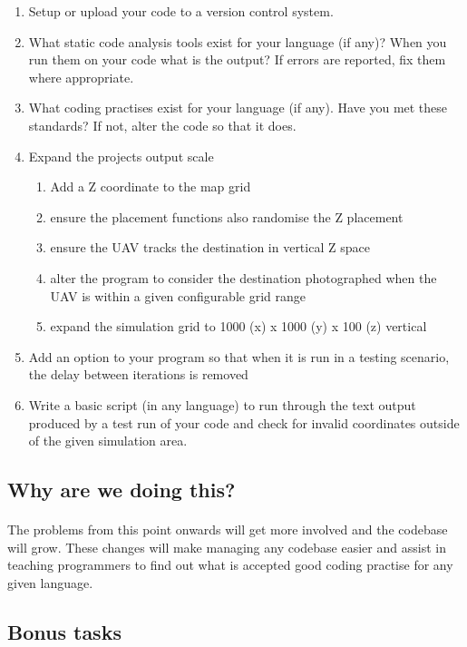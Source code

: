 \documentclass[11pt]{book}
\begin{document}
\begin{enumerate}
\item Setup or upload your code to a version control system.
\item What static code analysis tools exist for your language (if any)? When you run them on your code what is the output? If errors are reported, fix them where appropriate.
\item What coding practises exist for your language (if any). Have you met these standards? If not, alter the code so that it does.
\item Expand the projects output scale
    \begin{enumerate}
        \item Add a Z coordinate to the map grid
        \item ensure the placement functions also randomise the Z placement
        \item ensure the UAV tracks the destination in vertical Z space
        \item alter the program to consider the destination photographed when the UAV is within a given configurable grid range
        \item expand the simulation grid to 1000 (x) x 1000 (y) x 100 (z) vertical
    \end{enumerate}
\item Add an option to your program so that when it is run in a testing scenario, the delay between iterations is removed
\item Write a basic script (in any language) to run through the text output produced by a test run of your code and check for invalid coordinates outside of the given simulation area.
\end{enumerate}

\subsection{Why are we doing this?}

\paragraph{} The problems from this point onwards will get more involved and
the codebase will grow. These changes will make managing any codebase easier
and assist in teaching programmers to find out what is accepted good coding
practise for any given language.

\subsection{Bonus tasks}
\end{document}
